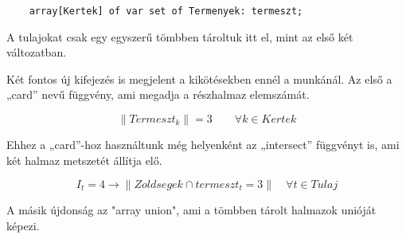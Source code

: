 \documentclass[12pt,a4paper,twoside, openright]{report}
\begin{document}
    \begin{lstlisting}
    array[Kertek] of var set of Termenyek: termeszt;
    \end{lstlisting}

    A tulajokat csak egy egyszerű tömbben tároltuk itt el, mint az első két változatban.

    Két fontos új kifejezés is megjelent a kikötésekben ennél a munkánál.
    Az első a „card” nevű függvény, ami megadja a részhalmaz elemszámát.

    \begin{equation}
    \left\| Termeszt_k \right\| =3 \qquad \forall k \in Kertek
    \end{equation}

    Ehhez a „card”-hoz használtunk még helyenként az „intersect” függvényt is, ami két halmaz metszetét állítja elő.

    \begin{equation}
    I_t=4 \rightarrow \left\| Zoldsegek \cap termeszt_t =3 \right\| \quad \forall t \in Tulaj
    \end{equation}

    A másik újdonság az "array union", ami a tömbben tárolt halmazok unióját képezi.
    
\end{document}
